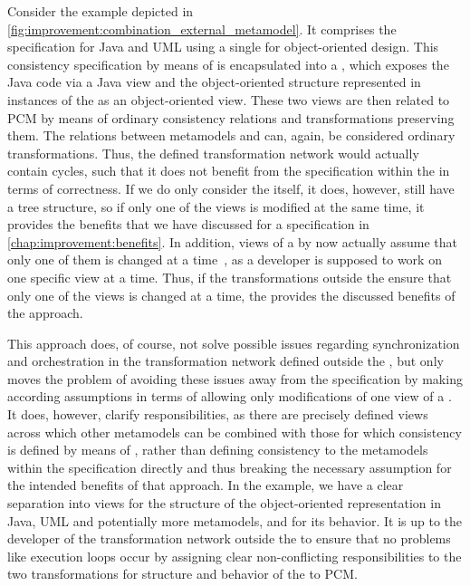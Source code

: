 Consider the example depicted in \autoref{fig:improvement:combination_external_metamodel}.
It comprises the \commonalities specification for Java and \gls{UML} using a single \conceptmetamodel for object-oriented design.
This consistency specification by means of \commonalities is encapsulated into a \vsum, which exposes the Java code via a Java view and the object-oriented structure represented in instances of the \conceptmetamodel as an object-oriented view.
These two views are then related to \gls{PCM} by means of ordinary consistency relations and transformations preserving them.
The relations between metamodels and \viewtypes can, again, be considered ordinary transformations.
Thus, the defined transformation network would actually contain cycles, such that it does not benefit from the \commonalities specification within the \vsum in terms of correctness.
If we do only consider the \vsum itself, it does, however, still have a tree structure, so if only one of the views is modified at the same time, it provides the benefits that we have discussed for a \commonalities specification in \autoref{chap:improvement:benefits}.
In addition, views of a \vsum by now actually assume that only one of them is changed at a time~, as a developer is supposed to work on one specific view at a time.
Thus, if the transformations outside the \vsum ensure that only one of the views is changed at a time, the \vsum provides the discussed benefits of the \commonalities approach.

This approach does, of course, not solve possible issues regarding synchronization and orchestration in the transformation network defined outside the \vsum, but only moves the problem of avoiding these issues away from the \commonalities specification by making according assumptions in terms of allowing only modifications of one view of a \vsum.
It does, however, clarify responsibilities, as there are precisely defined views across which other metamodels can be combined with those for which consistency is defined by means of \commonalities, rather than defining consistency to the metamodels within the \commonalities specification directly and thus breaking the necessary assumption for the intended benefits of that approach.
In the example, we have a clear separation into views for the structure of the object-oriented representation in Java, \gls{UML} and potentially more metamodels, and for its behavior.
It is up to the developer of the transformation network outside the \vsum to ensure that no problems like execution loops occur by assigning clear non-conflicting responsibilities to the two transformations for structure and behavior of the \vsum to \gls{PCM}.


